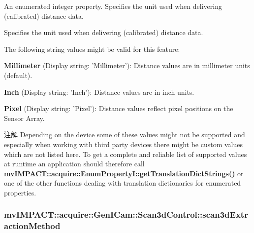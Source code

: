 An enumerated integer property. Specifies the unit used when delivering (calibrated) distance data. 

Specifies the unit used when delivering (calibrated) distance data.

The following string values might be valid for this feature\+:
\begin{DoxyItemize}
\item {\bfseries Millimeter} (Display string\+: 'Millimeter')\+: Distance values are in millimeter units (default).
\item {\bfseries Inch} (Display string\+: 'Inch')\+: Distance values are in inch units.
\item {\bfseries Pixel} (Display string\+: 'Pixel')\+: Distance values reflect pixel positions on the Sensor Array.
\end{DoxyItemize}

\begin{DoxyNote}{注解}
Depending on the device some of these values might not be supported and especially when working with third party devices there might be custom values which are not listed here. To get a complete and reliable list of supported values at runtime an application should therefore call {\bfseries \hyperlink{classmv_i_m_p_a_c_t_1_1acquire_1_1_enum_property_i_a0ba6ccbf5ee69784d5d0b537924d26b6}{mv\+I\+M\+P\+A\+C\+T\+::acquire\+::\+Enum\+Property\+I\+::get\+Translation\+Dict\+Strings()}} or one of the other functions dealing with translation dictionaries for enumerated properties. 
\end{DoxyNote}
\hypertarget{classmv_i_m_p_a_c_t_1_1acquire_1_1_gen_i_cam_1_1_scan3d_control_a81f9b35309a0ed35ba127f1fa9ef2788}{
\subsubsection[{scan3d\+Extraction\+Method}]{ mv\+I\+M\+P\+A\+C\+T\+::acquire\+::\+Gen\+I\+Cam\+::\+Scan3d\+Control\+::scan3d\+Extraction\+Method}}\label{classmv_i_m_p_a_c_t_1_1acquire_1_1_gen_i_cam_1_1_scan3d_control_a81f9b35309a0ed35ba127f1fa9ef2788}


